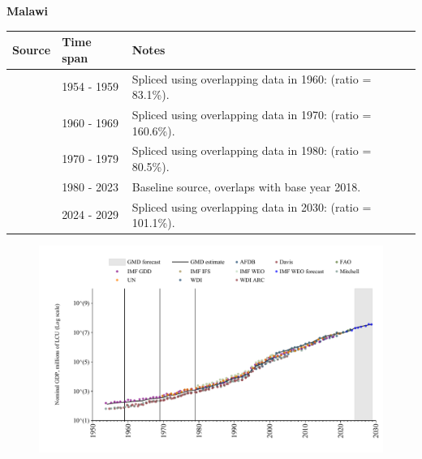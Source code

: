 \documentclass[12pt,a4paper,landscape]{article}
\begin{document}
\begin{adjustbox}{max totalsize={\paperwidth}{\paperheight},center}
\begin{minipage}[t][\textheight][t]{\textwidth}
\vspace*{0.5cm}
{}
\begin{center}
{\Large\bfseries Malawi}
\end{center}
\vspace{0.5cm}
\begin{table}[H]
\centering
\small
\begin{tabular}{|l|l|l|}
\hline
\textbf{Source} & \textbf{Time span} & \textbf{Notes} \\
\hline
\rowcolor{white}\cite{IMF_GDD}& 1954 - 1959 &Spliced using overlapping data in 1960: (ratio = 83.1\%).\\
\rowcolor{lightgray}\cite{WDI_ARC}& 1960 - 1969 &Spliced using overlapping data in 1970: (ratio = 160.6\%).\\
\rowcolor{white}\cite{UN}& 1970 - 1979 &Spliced using overlapping data in 1980: (ratio = 80.5\%).\\
\rowcolor{lightgray}\cite{WDI}& 1980 - 2023 &Baseline source, overlaps with base year 2018.\\
\rowcolor{white}\cite{IMF_WEO_forecast}& 2024 - 2029 &Spliced using overlapping data in 2030: (ratio = 101.1\%).\\
\hline
\end{tabular}
\end{table}
\begin{figure}[H]
\centering
\includegraphics[width=\textwidth,height=0.6\textheight,keepaspectratio]{graphs/MWI_nGDP.pdf}
\end{figure}
\end{minipage}
\end{adjustbox}
\end{document}
